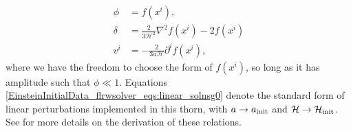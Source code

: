 \begin{subequations} \label{EinsteinInitialData_flrwsolver_eqs:linear_solnsg0}
    \begin{align}
    	\phi &= f(x^{i}), \label{EinsteinInitialData_flrwsolver_eq:linear_phi}\\
     	\delta &= \frac{2}{3\mathcal{H}^2} \nabla^{2}f(x^{i}) - 2 f(x^i) \\ %
     	v^{i} &= -\frac{2}{3 a \mathcal{H}} \partial^{i}f(x^{i}),
    \end{align}
\end{subequations}
where we have the freedom to choose the form of $f(x^i)$, so long as it has amplitude such that $\phi\ll1$. Equations \eqref{EinsteinInitialData_flrwsolver_eqs:linear_solnsg0} denote the standard form of linear perturbations implemented in this thorn, with $a\rightarrow a_{\rm init}$ and $\mathcal{H}\rightarrow\mathcal{H}_{\rm init}$. See \cite{EinsteinInitialData_flrwsolver_macpherson2019} for more details on the derivation of these relations. 

